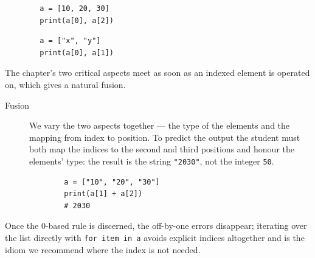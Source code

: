 \begin{description}
    \hfill
    \begin{minipage}[t]{0.45\columnwidth}
      \begin{verbatim}
        a = [10, 20, 30]
        print(a[0], a[2])
      \end{verbatim}
    \end{minipage}
    \hfill
    \begin{minipage}[t]{0.45\columnwidth}
      \begin{verbatim}
        a = ["x", "y"]
        print(a[0], a[1])
      \end{verbatim}
    \end{minipage}
\end{description}

The chapter's two critical aspects meet as soon as an indexed element is
operated on, which gives a natural fusion.

\begin{description}
  \item[Fusion] We vary the two aspects together --- the type of the elements
    and the mapping from index to position. To predict the output the student
    must both map the indices to the second and third positions and honour the
    elements' type: the result is the string \texttt{"2030"}, not
    the integer \texttt{50}.

    \hfill
    \begin{minipage}[t]{0.5\columnwidth}
      \begin{verbatim}
        a = ["10", "20", "30"]
        print(a[1] + a[2])
        # 2030
      \end{verbatim}
    \end{minipage}
\end{description}

Once the 0-based rule is discerned, the off-by-one errors disappear; iterating
over the list directly with \texttt{for item in a} avoids explicit
indices altogether and is the idiom we recommend where the index is not needed.
